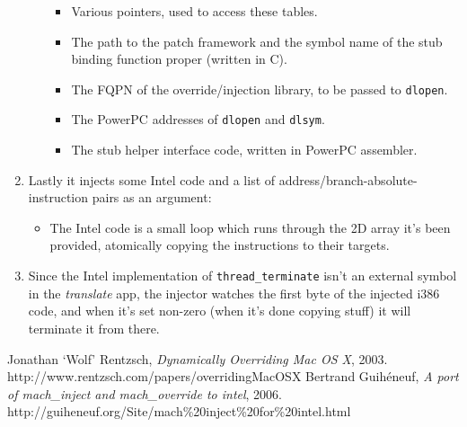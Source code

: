 \documentclass[english]{article}
\begin{document}
\begin{enumerate}
\begin{enumerate}
\begin{itemize}
      \item Various pointers, used to access these tables.
      \item The path to the patch framework and the symbol name of the stub binding function proper (written in C).
      \item The FQPN of the override/injection library, to be passed to \texttt{dlopen}.
      \item The PowerPC addresses of \texttt{dlopen} and \texttt{dlsym}.
      \item The stub helper interface code, written in PowerPC assembler.
    \end{itemize}
  \end{enumerate}
  \item Lastly it injects some Intel code and a list of address/branch-absolute-instruction pairs as an argument:
  \begin{itemize}
    \item The Intel code is a small loop which runs through the 2D array it's been provided, atomically copying the instructions to their targets.
  \end{itemize}
  \item Since the Intel implementation of \texttt{thread\_terminate} isn't an external symbol in the \textsl{translate} app, the injector watches the first byte of the injected i386 code, and when it's set non-zero (when it's done copying stuff) it will terminate it from there.
\end{enumerate}

\begin{thebibliography}{9}
    Jonathan `Wolf' Rentzsch,
    \emph{Dynamically Overriding Mac OS X},
    2003. \\
    http://www.rentzsch.com/papers/overridingMacOSX
    Bertrand Guih\'{e}neuf,
    \emph{A port of mach\_inject and mach\_override to intel},
    2006. \\
    http://guiheneuf.org/Site/mach\%20inject\%20for\%20intel.html
\end{thebibliography}
\end{document}
